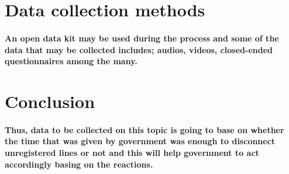 \documentclass[12pt]{report}
\begin{document}
\section{Data collection methods}
\paragraph{An open data kit may be used during the process and some of the data that may be collected includes; audios, videos, closed-ended questionnaires among the many.}

\section{Conclusion}
\paragraph{Thus, data to be collected on this topic is going to base on whether the time that was given by government was enough to disconnect unregistered lines or not and this will help government to act accordingly basing on the reactions.}
\end{document}
